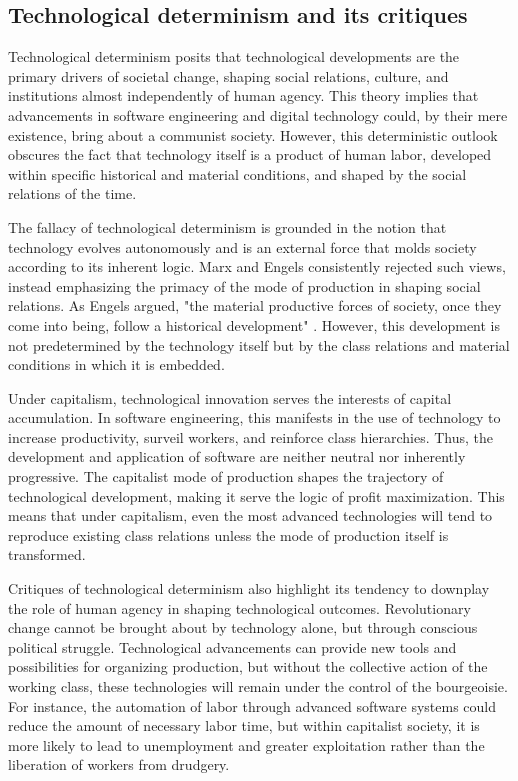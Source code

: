 \begin{refsection}
\subsection{Technological determinism and its critiques}

Technological determinism posits that technological developments are the primary drivers of societal change, shaping social relations, culture, and institutions almost independently of human agency. This theory implies that advancements in software engineering and digital technology could, by their mere existence, bring about a communist society. However, this deterministic outlook obscures the fact that technology itself is a product of human labor, developed within specific historical and material conditions, and shaped by the social relations of the time.

The fallacy of technological determinism is grounded in the notion that technology evolves autonomously and is an external force that molds society according to its inherent logic. Marx and Engels consistently rejected such views, instead emphasizing the primacy of the mode of production in shaping social relations. As Engels argued, "the material productive forces of society, once they come into being, follow a historical development" \cite[pp.~184]{engels_dialectics_of_nature}. However, this development is not predetermined by the technology itself but by the class relations and material conditions in which it is embedded.

Under capitalism, technological innovation serves the interests of capital accumulation. In software engineering, this manifests in the use of technology to increase productivity, surveil workers, and reinforce class hierarchies. Thus, the development and application of software are neither neutral nor inherently progressive. The capitalist mode of production shapes the trajectory of technological development, making it serve the logic of profit maximization. This means that under capitalism, even the most advanced technologies will tend to reproduce existing class relations unless the mode of production itself is transformed.

Critiques of technological determinism also highlight its tendency to downplay the role of human agency in shaping technological outcomes. Revolutionary change cannot be brought about by technology alone, but through conscious political struggle. Technological advancements can provide new tools and possibilities for organizing production, but without the collective action of the working class, these technologies will remain under the control of the bourgeoisie. For instance, the automation of labor through advanced software systems could reduce the amount of necessary labor time, but within capitalist society, it is more likely to lead to unemployment and greater exploitation rather than the liberation of workers from drudgery.


\end{refsection}

